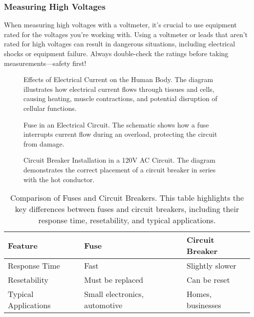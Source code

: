 \subsubsection*{Measuring High Voltages}
When measuring high voltages with a voltmeter, it’s crucial to use equipment rated for the voltages you’re working with. Using a voltmeter or leads that aren’t rated for high voltages can result in dangerous situations, including electrical shocks or equipment failure. Always double-check the ratings before taking measurements—safety first!

\begin{figure}[h!]
    \centering
    \caption{Effects of Electrical Current on the Human Body. The diagram illustrates how electrical current flows through tissues and cells, causing heating, muscle contractions, and potential disruption of cellular functions.}
    \label{fig:current-effects}
\end{figure}

\begin{figure}[h!]
    \centering
    \caption{Fuse in an Electrical Circuit. The schematic shows how a fuse interrupts current flow during an overload, protecting the circuit from damage.}
    \label{fig:fuse-circuit}
\end{figure}

\begin{figure}[h!]
    \centering
    \caption{Circuit Breaker Installation in a 120V AC Circuit. The diagram demonstrates the correct placement of a circuit breaker in series with the hot conductor.}
    \label{fig:circuit-breaker}
\end{figure}

\begin{table}[h!]
    \centering
    \begin{tabular}{|l|l|l|}
        \hline
        \textbf{Feature} & \textbf{Fuse} & \textbf{Circuit Breaker} \\
        \hline
        Response Time & Fast & Slightly slower \\
        Resetability & Must be replaced & Can be reset \\
        Typical Applications & Small electronics, automotive & Homes, businesses \\
        \hline
    \end{tabular}
    \caption{Comparison of Fuses and Circuit Breakers. This table highlights the key differences between fuses and circuit breakers, including their response time, resetability, and typical applications.}
    \label{tab:fuse-vs-breaker}
\end{table}

